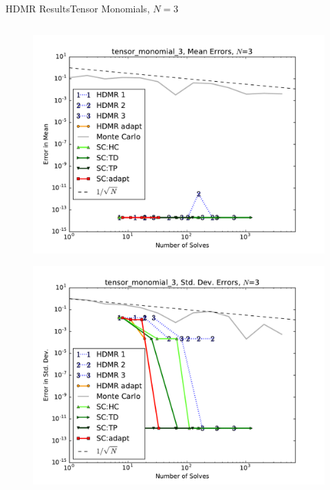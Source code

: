 \documentclass{beamer}
\begin{document}
\begin{frame}{HDMR Results}{Tensor Monomials, $N=3$}
\begin{columns}
\begin{column}{0.5\textwidth}
\begin{figure}[h!]
          \includegraphics[width=0.8\linewidth]{anlmodels/tensor_monomial_3_mean_errs}
        \end{figure}
        \vspace{-20pt}
        \begin{figure}[h!]
          \centering
          \includegraphics[width=0.8\linewidth]{anlmodels/tensor_monomial_3_variance_errs}
        \end{figure}
   \end{column}
 \end{columns}
\end{frame}
\end{document}
